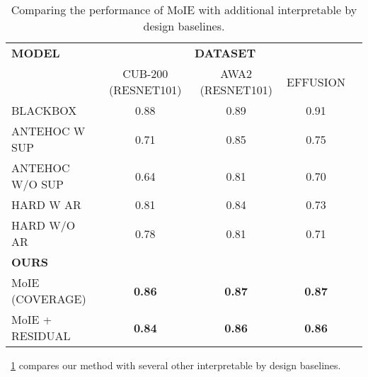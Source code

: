 \begin{table}[H]
\caption{Comparing the performance of MoIE with additional interpretable by design baselines.
}
\fontsize{7.5pt}{0.20cm}\selectfont
\label{tab:performance_app}
\begin{center}
\begin{tabular}{p{23em} c c c c}
\toprule 
        \textbf{MODEL} & \multicolumn{3}{c}{\textbf{DATASET}} \\
       & CUB-200 (RESNET101) & AWA2 (RESNET101) & EFFUSION  \\
\midrule 
    BLACKBOX & 0.88 & 0.89 & 0.91 \\
\midrule 
ANTEHOC W SUP~\cite{sarkar2021inducing} & 0.71 & 0.85 & 0.75\\
ANTEHOC W/O SUP~\cite{sarkar2021inducing} & 0.64 & 0.81 & 0.70\\
HARD W AR~\cite{havasi2022addressing} & 0.81 & 0.84 & 0.73\\
HARD W/O AR~\cite{havasi2022addressing} & 0.78 & 0.81 & 0.71\\
\midrule
\textbf{OURS} \\
MoIE (COVERAGE) &\textbf{0.86} &
     \textbf{0.87}
     & \textbf{0.87} \\
MoIE + RESIDUAL &\textbf{0.84} &
     \textbf{0.86}
     & \textbf{0.86} \\
\bottomrule
\end{tabular}
\end{center}
\end{table}
~\cref{tab:performance_app} compares our method with several other interpretable by design baselines.
